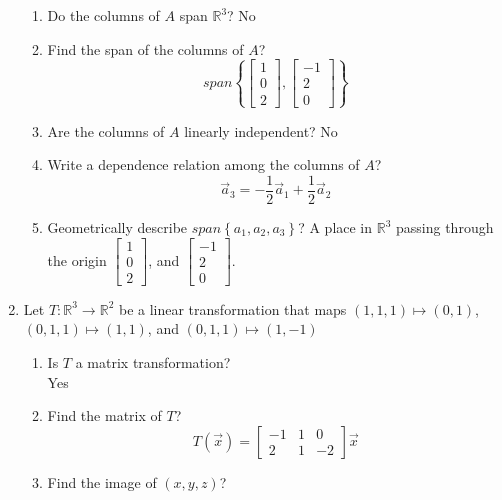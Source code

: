 \documentclass[11pt]{article}
\begin{document}
\begin{enumerate}
        \begin{enumerate}
          \item Do the columns of $A$ span $\mathbb{R}^{3}$?
                No
          \item Find the span of the columns of $A$?
                \[span \left\{\begin{bmatrix} 1 \\ 0 \\ 2 \end{bmatrix} , \begin{bmatrix} -1  \\ 2 \\ 0 \end{bmatrix}\right\}\]
          \item Are the columns of $A$ linearly independent?
                No
          \item Write a dependence relation among the columns of $A$?
                \[\vec{a}_{3} = -\frac{1}{2}\vec{a}_{1} + \frac{1}{2}\vec{a}_{2}\]
          \item Geometrically describe $span \left\{a_{1}, a_{2}, a_{3}\right\}$?
                A place in $\mathbb{R}^{3}$ passing through the origin $\begin{bmatrix} 1 \\ 0 \\ 2 \end{bmatrix}$, and
                $\begin{bmatrix} -1 \\ 2 \\ 0 \end{bmatrix}$.
        \end{enumerate}
        \item Let $T : \mathbb{R}^{3} \to \mathbb{R}^{2}$ be a linear transformation that maps $(1,1,1) \mapsto (0,1)$, $(0,1,1) \mapsto (1,1)$, and $(0,1,1) \mapsto (1,-1)$
        \begin{enumerate}
          \item Is $T$ a matrix transformation?\\
                Yes
          \item Find the matrix of $T$?\\
                \[T(\vec{x}) = \begin{bmatrix} -1 & 1 & 0 \\ 2 & 1 & -2 \end{bmatrix} \vec{x}\]
          \item Find the image of $(x,y,z)$?\\

\end{enumerate}
\end{enumerate}
\end{document}
